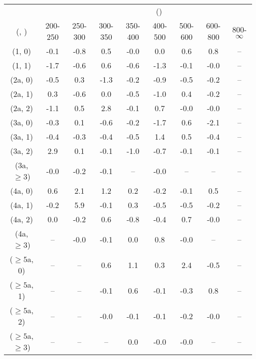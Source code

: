 \begin{table}[h!]
\tiny
\centering
{}
\begin{tabular}
{ccccccccc}
	\hline\hline
&	& \multicolumn{8}{c}{\scalht (\gev)} \\ 
	 (\njet,  \nb) & 200-250 & 250-300 & 300-350 & 350-400 & 400-500 & 500-600 & 600-800 & 800-$\infty$ \\ [0.8ex] 
\hline
	(1, 0) & -0.1 & -0.8 & 0.5 & -0.0 & 0.0 & 0.6 & 0.8 & -- \\[0.5ex] 
	(1, 1) & -1.7 & -0.6 & 0.6 & -0.6 & -1.3 & -0.1 & -0.0 & -- \\[0.5ex] 
	(2a, 0) & -0.5 & 0.3 & -1.3 & -0.2 & -0.9 & -0.5 & -0.2 & -- \\[0.5ex] 
	(2a, 1) & 0.3 & -0.6 & 0.0 & -0.5 & -1.0 & 0.4 & -0.2 & -- \\[0.5ex] 
	(2a, 2) & -1.1 & 0.5 & 2.8 & -0.1 & 0.7 & -0.0 & -0.0 & -- \\[0.5ex] 
	(3a, 0) & -0.3 & 0.1 & -0.6 & -0.2 & -1.7 & 0.6 & -2.1 & -- \\[0.5ex] 
	(3a, 1) & -0.4 & -0.3 & -0.4 & -0.5 & 1.4 & 0.5 & -0.4 & -- \\[0.5ex] 
	(3a, 2) & 2.9 & 0.1 & -0.1 & -1.0 & -0.7 & -0.1 & -0.1 & -- \\[0.5ex] 
	(3a, $\ge3$) & -0.0 & -0.2 & -0.1 & -- & -0.0 & -- & -- & -- \\[0.5ex] 
	(4a, 0) & 0.6 & 2.1 & 1.2 & 0.2 & -0.2 & -0.1 & 0.5 & -- \\[0.5ex] 
	(4a, 1) & -0.2 & 5.9 & -0.1 & 0.3 & -0.5 & -0.5 & -0.2 & -- \\[0.5ex] 
	(4a, 2) & 0.0 & -0.2 & 0.6 & -0.8 & -0.4 & 0.7 & -0.0 & -- \\[0.5ex] 
	(4a, $\ge3$) & -- & -0.0 & -0.1 & 0.0 & 0.8 & -0.0 & -- & -- \\[0.5ex] 
	($\ge5$a, 0) & -- & -- & 0.6 & 1.1 & 0.3 & 2.4 & -0.5 & -- \\[0.5ex] 
	($\ge5$a, 1) & -- & -- & -0.1 & 0.6 & -0.1 & -0.3 & 0.8 & -- \\[0.5ex] 
	($\ge5$a, 2) & -- & -- & -0.0 & -0.1 & -0.1 & -0.2 & -0.0 & -- \\[0.5ex] 
	($\ge5$a, $\ge3$) & -- & -- & -- & 0.0 & -0.0 & -0.0 & -- & -- \\[0.5ex] 
	\hline
	\hline
\end{tabular}
\end{table}
